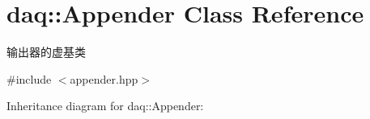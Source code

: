 \hypertarget{classdaq_1_1Appender}{}\section{daq\+:\+:Appender Class Reference}
\label{classdaq_1_1Appender}


输出器的虚基类  




{\ttfamily \#include $<$appender.\+hpp$>$}



Inheritance diagram for daq\+:\+:Appender\+:
